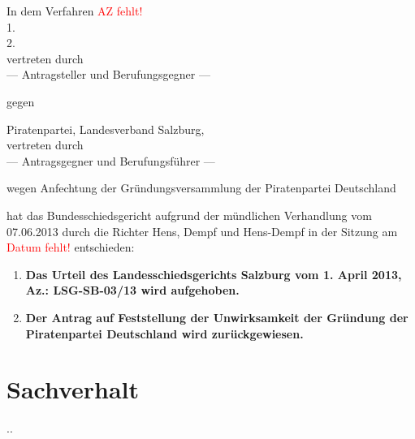 %
%



\newcommand{\Aktenzeichen}{\textcolor{red}{AZ fehlt!}}
\newcommand{\Datum}       {\textcolor{red}{Datum fehlt!}}
\newcommand{\Titel}       {\textcolor{red}{Urteil/Beschluss} zu {\Aktenzeichen}}



In dem Verfahren \Aktenzeichen\\

1. \\[0.1em]
2. \\[0.1em]
vertreten durch \\[0.1em]
--- Antragsteller und Berufungsgegner ---

gegen

Piratenpartei, Landesverband Salzburg, \\[0.1em]
vertreten durch \\[0.1em]
--- Antragsgegner und Berufungsführer ---

wegen Anfechtung der Gründungsversammlung der Piratenpartei Deutschland

hat das Bundesschiedsgericht aufgrund der mündlichen Verhandlung vom 07.06.2013 durch die Richter Hens, Dempf und Hens-Dempf in der Sitzung am {\Datum} entschieden:

\begin{enumerate}
\item \textbf{Das Urteil des Landesschiedsgerichts Salzburg vom 1. April 2013, Az.: LSG-SB-03/13 wird aufgehoben.}
\item \textbf{Der Antrag auf Feststellung der Unwirksamkeit der Gründung der Piratenpartei Deutschland wird zurückgewiesen.}
\end{enumerate}

\section*{Sachverhalt}

..

